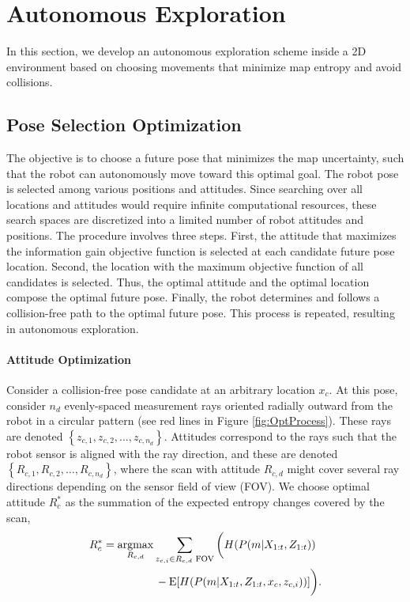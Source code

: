 \documentclass[smallextended]{svjour3}       %
\newcommand{\braces}[1]{\ensuremath{\left\{ #1 \right\}}}
\newcommand{\argmax}{\operatornamewithlimits{argmax}}
\begin{document}
\section{Autonomous Exploration}

In this section, we develop an autonomous exploration scheme inside a 2D environment based on choosing movements that minimize map entropy and avoid collisions.

\subsection{Pose Selection Optimization}

The objective is to choose a future pose that minimizes the map uncertainty, such that the robot can autonomously move toward this optimal goal. The robot pose is selected among various positions and attitudes. Since searching over all locations and attitudes would require infinite computational resources, these search spaces are discretized into a limited number of robot attitudes and positions.
The procedure involves three steps. First, the attitude that maximizes the information gain objective function is selected at each candidate future pose location. Second, the location with the maximum objective function of all candidates is selected. Thus, the optimal attitude and the optimal location compose the optimal future pose. Finally, the robot determines and follows a collision-free path to the optimal future pose. This process is repeated, resulting in autonomous exploration.


\paragraph{Attitude Optimization}
Consider a collision-free pose candidate at an arbitrary location $x_c$. At this pose, consider $n_d$ evenly-spaced measurement rays oriented radially outward from the robot in a circular pattern (see red lines in Figure \ref{fig:OptProcess}). These rays are denoted $\braces{z_{c,1},z_{c,2},\ldots,z_{c,n_d}}$. Attitudes correspond to the rays such that the robot sensor is aligned with the ray direction, and these are denoted $\braces{R_{c,1},R_{c,2},\ldots,R_{c,n_d}}$, where the scan with attitude $R_{c,d}$ might cover several ray directions depending on the sensor field of view (FOV). We choose optimal attitude $R_c^*$ as the summation of the expected entropy changes covered by the scan,
\begin{align}
\label{eqn:FindRc}
&R_c^*=\argmax_{R_{c,d}}\sum_{z_{c,i}\in R_{c,d}\text{ FOV}}\bigg(H(P(m|X_{1:t},Z_{1:t}))\nonumber\\&\qquad\quad\quad\quad\quad
-\text{E}[H(P(m|X_{1:t},Z_{1:t},x_c,z_{c,i}))]\bigg).
\end{align}
\end{document}

